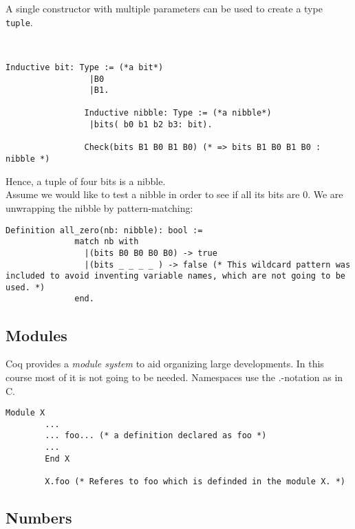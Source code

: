 	    A single constructor with multiple parameters can be used to create a type \lstinline!tuple!.
		\begin{example}~\\\vspace{-10mm}
	 	 	{\normalfont 
	 	 	    \begin{lstlisting}[caption = \lstinline!bit! and \lstinline!nibbel!]
	 	 		Inductive bit: Type := (*a bit*) 
	 	 		 |B0
	 	 		 |B1.
	 	 		 
	 		    Inductive nibble: Type := (*a nibble*)
	 		   	 |bits( b0 b1 b2 b3: bit).
	 		   			 	
	 		   	Check(bits B1 B0 B1 B0) (* => bits B1 B0 B1 B0 : nibble *)
	 		\end{lstlisting}
	 		Hence, a tuple of four bits is a nibble.\\ 		
	 		Assume we would like to test a nibble in order to see if all its bits are 0. 
	 		We are unwrapping the nibble by pattern-matching:
	 		\begin{lstlisting}[caption = \lstinline!all_zero!]
	 		Definition all_zero(nb: nibble): bool :=
	 		  match nb with
	 	  	    |(bits B0 B0 B0 B0) -> true
	 		    |(bits _ _ _ _ ) -> false (* This wildcard pattern was included to avoid inventing variable names, which are not going to be used. *) 
	 		  end.
	 		 \end{lstlisting}}
	 	\end{example}
	 	
	\subsection{Modules}
	
		Coq provides a {\itshape module system} to aid organizing large developments.
		In this course most of it is not going to be needed. Namespaces use the $.$-notation as in C.
	
		\begin{lstlisting}[caption = \lstinline!Module!]
		Module X 
		...
		... foo... (* a definition declared as foo *)
		...
		End X
		
		X.foo (* Referes to foo which is definded in the module X. *)
		\end{lstlisting}
		
	\subsection{Numbers}
	
